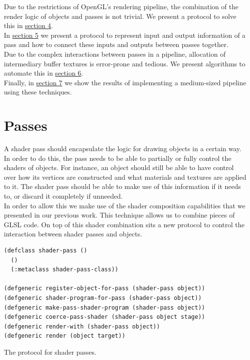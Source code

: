 \documentclass[format=sigconf]{acmart}
\begin{document}
Due to the restrictions of OpenGL's rendering pipeline, the combination of the render logic of objects and passes is not trivial. We present a protocol to solve this in \hyperref[passes]{section 4}. \\

In \hyperref[pipelines]{section 5} we present a protocol to represent input and output information of a pass and how to connect these inputs and outputs between passes together. \\

Due to the complex interactions between passes in a pipeline, allocation of intermediary buffer textures is error-prone and tedious. We present algorithms to automate this in \hyperref[allocation]{section 6}. \\

Finally, in \hyperref[concept]{section 7} we show the results of implementing a medium-sized pipeline using these techniques.

\section{Passes}\label{passes}
A shader pass should encapsulate the logic for drawing objects in a certain way. In order to do this, the pass needs to be able to partially or fully control the shaders of objects. For instance, an object should still be able to have control over how its vertices are constructed and what materials and textures are applied to it. The shader pass should be able to make use of this information if it needs to, or discard it completely if unneeded. \\

In order to allow this we make use of the shader composition capabilities that we presented in our previous work\cite{glsloop}. This technique allows us to combine pieces of GLSL code. On top of this shader combination sits a new protocol to control the interaction between shader passes and objects. \\

\begin{listing}[h]
\begin{verbatim}
(defclass shader-pass ()
  ()
  (:metaclass shader-pass-class))

(defgeneric register-object-for-pass (shader-pass object))
(defgeneric shader-program-for-pass (shader-pass object))
(defgeneric make-pass-shader-program (shader-pass object))
(defgeneric coerce-pass-shader (shader-pass object stage))
(defgeneric render-with (shader-pass object))
(defgeneric render (object target))
\end{verbatim}
\caption{The protocol for shader passes.}
\label{lst:pass}
\end{listing}
\end{document}
